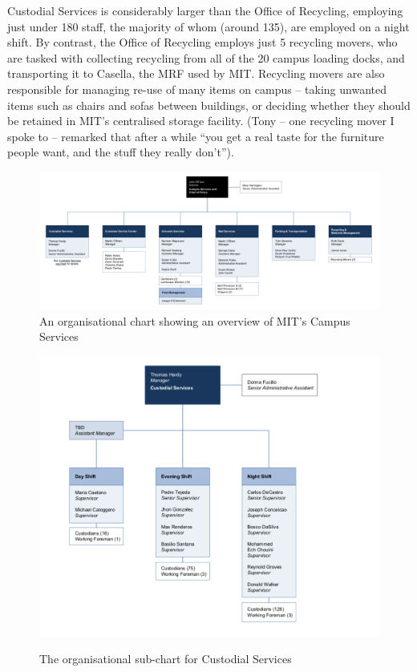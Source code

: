 \documentclass[nofonts,nols,justified,nobib]{tufte-book}
\begin{document}
Custodial Services is considerably larger than the Office of Recycling, employing just under 180 staff, the majority of whom (around 135), are employed on a night shift. By contrast, the Office of Recycling employs just 5 recycling movers, who are tasked with collecting recycling from all of the 20 campus loading docks, and transporting it to Casella, the MRF used by MIT. Recycling movers are also responsible for managing re-use of many items on campus -- taking unwanted items such as chairs and sofas between buildings, or deciding whether they should be retained in MIT's centralised storage facility. (Tony -- one recycling mover I spoke to -- remarked that after a while ``you get a real taste for the furniture people want, and the stuff they really don't'').

\begin{figure}
 \includegraphics[width=1\linewidth]{img/2/campus-services-overview.png}
    \caption{An organisational chart showing an overview of MIT's Campus Services}
\end{figure}

\begin{figure}
 \includegraphics[width=1\linewidth]{img/2/custodial-overview.png}
  \label{orgs}
    \caption{The organisational sub-chart for Custodial Services}
\end{figure}
\end{document}

